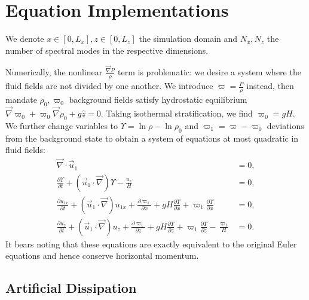 \documentclass[
        fleqn,
        usenatbib,
    ]{mnras}
\newcommand*{\pd}[2]{\frac{\partial#1}{\partial#2}}
\newcommand*{\p}[1]{\left(#1\right)}
\begin{document}
\clearpage
\onecolumn
\appendix

\section{Equation Implementations}\label{ss:strat_impl}

We denote $x \in [0, L_x], z \in [0, L_z]$ the simulation domain and $N_x, N_z$
the number of spectral modes in the respective dimensions.

Numerically, the nonlinear $\frac{\vec{\nabla}P}{\rho}$ term is problematic: we
desire a system where the fluid fields are not divided by one another. We
introduce $\varpi = \frac{P}{\rho}$ instead, then mandate $\rho_0, \varpi_0$
background fields satisfy hydrostatic equilibrium $\vec{\nabla}\varpi_0 +
\varpi_0 \vec{\nabla}\rho_0 + g\hat{z} = 0$. Taking isothermal stratification,
we find $\varpi_0 = gH$. We further change variables to $\Upsilon = \ln \rho -
\ln \rho_0$ and $\varpi_1 = \varpi - \varpi_0$ deviations from the background
state to obtain a system of equations at most quadratic in fluid fields:
\begin{subequations}\label{se:nl_var}
    \begin{align}
        \vec{\nabla} \cdot \vec{u}_1 &= 0,\\
        \pd{\Upsilon}{t} + \p{\vec{u}_1 \cdot \vec{\nabla}} \Upsilon
            - \frac{u_z}{H} &= 0,\\
        \pd{u_{1x}}{t} + \p{\vec{u}_1 \cdot \vec{\nabla}}u_{1x}
            + \pd{\varpi_1}{x} + gH\pd{\Upsilon}{x}
            + \varpi_1 \pd{\Upsilon}{x} &= 0,\\
        \pd{u_z}{t} + \p{\vec{u}_1 \cdot \vec{\nabla}}u_z
            + \pd{\varpi_1}{z} + gH\pd{\Upsilon}{z}
            + \varpi_1 \pd{\Upsilon}{z} - \frac{\varpi_1}{H} &= 0.
    \end{align}
\end{subequations}
It bears noting that these equations are exactly equivalent to the original
Euler equations and hence conserve horizontal momentum.

\subsection{Artificial Dissipation}
\end{document}
